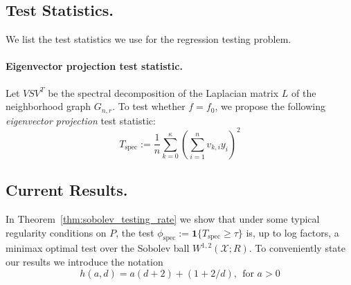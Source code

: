 \documentclass{article}
\newcommand{\1}{\mathbf{1}}
\theoremstyle{alden}
\theoremstyle{aldenthm}
\theoremstyle{definition}
\theoremstyle{remark}
\begin{document}
\subsection{Test Statistics.}
We list the test statistics we use for the regression testing problem.

\paragraph{Eigenvector projection test statistic.}
Let $VSV^T$ be the spectral decomposition of the Laplacian matrix $L$ of the neighborhood graph $G_{n,r}$. To test whether $f = f_0$, we propose the following \emph{eigenvector projection} test statistic:
\begin{equation}
\label{eqn:graph_spectral_projections}
T_{\mathrm{spec}} := \frac{1}{n} \sum_{k = 0}^{\kappa} \left(\sum_{i = 1}^{n} v_{k,i} y_i\right)^2
\end{equation}

\subsection{Current Results.}

In Theorem~\ref{thm:sobolev_testing_rate} we show that under some typical regularity conditions on $P$, the test $\phi_{\textrm{spec}} := \1\{T_{\mathrm{spec}} \geq \tau\}$ is, up to log factors, a minimax optimal test over the Sobolev ball $W^{1,2}(\mathcal{X};R)$. To conveniently state our results we introduce the notation
\begin{equation*}
h(a,d) = a(d+2) + (1 + 2/d),~~\textrm{for $a > 0$}
\end{equation*}
\end{document}
